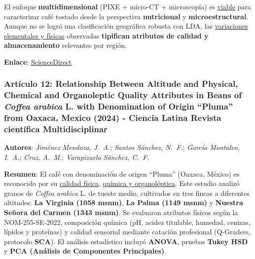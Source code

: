 \documentclass{article}
\begin{document}
El enfoque \textbf{multidimensional} (PIXE + micro{-}CT + microscopía) es \underline{viable} para caracterizar café tostado desde la perspectiva \textbf{nutricional} y \textbf{microestructural}. Aunque no se logró una clasificación geográfica robusta con LDA, las \underline{variaciones elementales y físicas} observadas \textbf{tipifican atributos de calidad y almacenamiento} relevantes por región. \vspace{0.5cm}

\textbf{Enlace}: \href{https://www.sciencedirect.com/science/article/pii/S2590157519300343}{ScienceDirect} \vspace{0.5cm}


\subsubsection{\textbf{Artículo 12:} \textcolor{Lemon Ginger}{\textbf{Relationship Between Altitude and Physical, Chemical and Organoleptic Quality Attributes in Beans of \textit{Coffea arabica} L. with Denomination of Origin ``Pluma'' from Oaxaca, Mexico (2024) - Ciencia Latina Revista científica Multidisciplinar}}}
\vspace{0.5cm}

\textbf{Autores}: \textit{Jiménez Mendoza, J.\ A.}; \textit{Santos Sánchez, N.\ F.}; \textit{García Montalvo, I.\ A.}; \textit{Cruz, A.\ M.}; \textit{Varapizuela Sánchez, C.\ F.} \vspace{0.5cm}

\textbf{Resumen}: El café con denominación de origen ``Pluma'' (Oaxaca, México) es reconocido por su \underline{calidad física,} \underline{química y organoléptica}. Este estudio analizó granos de \textit{Coffea arabica} L. de tueste medio, cultivados en tres fincas a diferentes altitudes: \textbf{La Virginia (1058 msnm)}, \textbf{La Palma (1149 msnm)} y \textbf{Nuestra Señora del Carmen (1343 msnm)}. Se evaluaron atributos físicos según la NOM-255-SE-2022, composición química (pH, acidez titulable, humedad, cenizas, lípidos y proteínas) y calidad sensorial mediante catación profesional (Q-Graders, protocolo \textbf{SCA}). El análisis estadístico incluyó \textbf{ANOVA}, pruebas \textbf{Tukey HSD} y \textbf{PCA (Análisis de Componentes Principales)}. \vspace{0.5cm}
\end{document}
